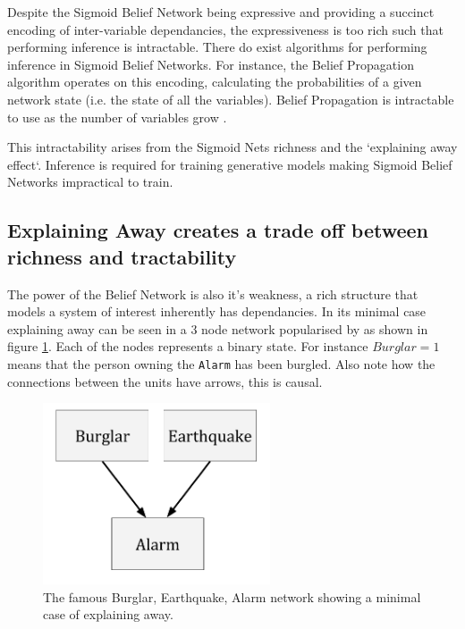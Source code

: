     Despite the Sigmoid Belief Network being expressive and providing a succinct encoding of inter-variable dependancies, the expressiveness is too rich such that performing inference is intractable. There do exist algorithms for performing inference in Sigmoid Belief Networks. For instance, the Belief Propagation algorithm  operates on this encoding, calculating the probabilities of a given network state (i.e. the state of all the variables).  Belief Propagation is intractable to use as the number of variables grow .

    This intractability arises from the Sigmoid Nets richness and the `explaining away effect`. Inference is required for training generative models making Sigmoid Belief Networks impractical to train. 

    \subsection{Explaining Away creates a trade off between richness and tractability}
    \todo%
    The power of the Belief Network is also it's weakness, a rich structure that models a system of interest inherently has dependancies. In its minimal case explaining away can be seen in a 3 node network popularised by  as shown in figure \ref{F:Explaining-Away}. Each of the nodes represents a binary state. For instance $Burglar = 1$ means that the person owning the \texttt{Alarm} has been burgled. Also note how the connections between the units have arrows, this is causal.

    \begin{figure}[h]
    \begin{center}
      \includegraphics[width = 0.6\textwidth]{Assets/Explaining_Away.png}
    \caption{The famous Burglar, Earthquake, Alarm network showing a minimal case of explaining away.}
    \label{F:Explaining-Away}
    \end{center}
    \end{figure}


